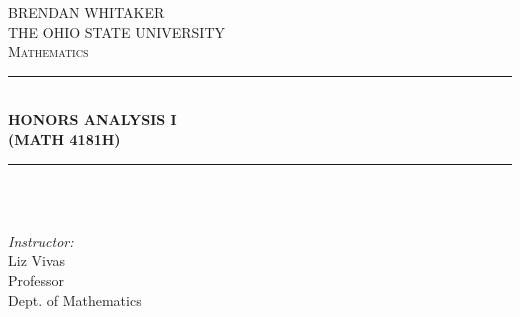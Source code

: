 \documentclass[12pt]{amsbook}
\theoremstyle{plain}
\numberwithin{section}{chapter}
\numberwithin{equation}{chapter}
\theoremstyle{definition}
\theoremstyle{remark}
\theoremstyle{plain}
\begin{document}
\begin{titlepage}

\newcommand{\HRule}{\rule{\linewidth}{0.5mm}} %

\center %
 

\textsc{\LARGE BRENDAN WHITAKER }\\[0.3cm] %
\textsc{\LARGE THE OHIO STATE UNIVERSITY  }\\[0.3cm]
\textsc{\Large Mathematics}\\[0.5cm] %


\HRule \\[0.4cm]
{ \Huge \bfseries HONORS ANALYSIS I\\
\vspace{1mm}  (MATH 4181H)}\\[0.03cm] %
\HRule \\[1.5cm]

 

~
\begin{minipage}{0.4\textwidth}
\begin{center} \large
\emph{Instructor:} \\
Liz Vivas\\Professor\\Dept. of Mathematics %
\end{center}
\end{minipage}\\[1cm]


\end{titlepage}
\end{document}
